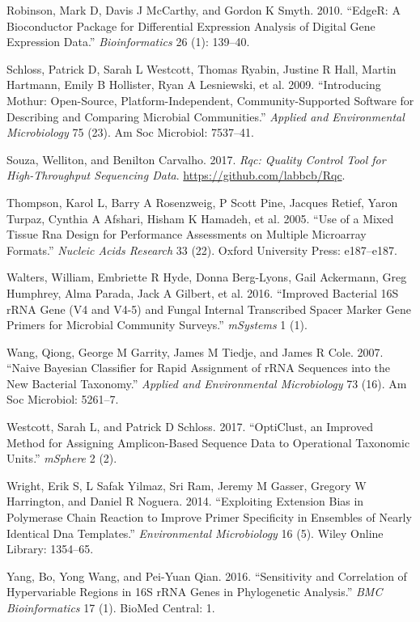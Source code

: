 \documentclass[smallextended]{svjour3}       %
\begin{document}
\leavevmode\hypertarget{ref-Robinson2010}{}%
Robinson, Mark D, Davis J McCarthy, and Gordon K Smyth. 2010. ``EdgeR: A
Bioconductor Package for Differential Expression Analysis of Digital
Gene Expression Data.'' \emph{Bioinformatics} 26 (1): 139--40.

\leavevmode\hypertarget{ref-schloss2009introducing}{}%
Schloss, Patrick D, Sarah L Westcott, Thomas Ryabin, Justine R Hall,
Martin Hartmann, Emily B Hollister, Ryan A Lesniewski, et al. 2009.
``Introducing Mothur: Open-Source, Platform-Independent,
Community-Supported Software for Describing and Comparing Microbial
Communities.'' \emph{Applied and Environmental Microbiology} 75 (23). Am
Soc Microbiol: 7537--41.

\leavevmode\hypertarget{ref-Rqc}{}%
Souza, Welliton, and Benilton Carvalho. 2017. \emph{Rqc: Quality Control
Tool for High-Throughput Sequencing Data}.
\url{https://github.com/labbcb/Rqc}.

\leavevmode\hypertarget{ref-thompson2005use}{}%
Thompson, Karol L, Barry A Rosenzweig, P Scott Pine, Jacques Retief,
Yaron Turpaz, Cynthia A Afshari, Hisham K Hamadeh, et al. 2005. ``Use of
a Mixed Tissue Rna Design for Performance Assessments on Multiple
Microarray Formats.'' \emph{Nucleic Acids Research} 33 (22). Oxford
University Press: e187--e187.

\leavevmode\hypertarget{ref-Walters2016-lf}{}%
Walters, William, Embriette R Hyde, Donna Berg-Lyons, Gail Ackermann,
Greg Humphrey, Alma Parada, Jack A Gilbert, et al. 2016. ``Improved
Bacterial 16S rRNA Gene (V4 and V4-5) and Fungal Internal Transcribed
Spacer Marker Gene Primers for Microbial Community Surveys.''
\emph{mSystems} 1 (1).

\leavevmode\hypertarget{ref-wang2007naive}{}%
Wang, Qiong, George M Garrity, James M Tiedje, and James R Cole. 2007.
``Naive Bayesian Classifier for Rapid Assignment of rRNA Sequences into
the New Bacterial Taxonomy.'' \emph{Applied and Environmental
Microbiology} 73 (16). Am Soc Microbiol: 5261--7.

\leavevmode\hypertarget{ref-westcott2017opticlust}{}%
Westcott, Sarah L, and Patrick D Schloss. 2017. ``OptiClust, an Improved
Method for Assigning Amplicon-Based Sequence Data to Operational
Taxonomic Units.'' \emph{mSphere} 2 (2).

\leavevmode\hypertarget{ref-wright2014exploiting}{}%
Wright, Erik S, L Safak Yilmaz, Sri Ram, Jeremy M Gasser, Gregory W
Harrington, and Daniel R Noguera. 2014. ``Exploiting Extension Bias in
Polymerase Chain Reaction to Improve Primer Specificity in Ensembles of
Nearly Identical Dna Templates.'' \emph{Environmental Microbiology} 16
(5). Wiley Online Library: 1354--65.

\leavevmode\hypertarget{ref-yang2016sensitivity}{}%
Yang, Bo, Yong Wang, and Pei-Yuan Qian. 2016. ``Sensitivity and
Correlation of Hypervariable Regions in 16S rRNA Genes in Phylogenetic
Analysis.'' \emph{BMC Bioinformatics} 17 (1). BioMed Central: 1.



\end{document}
